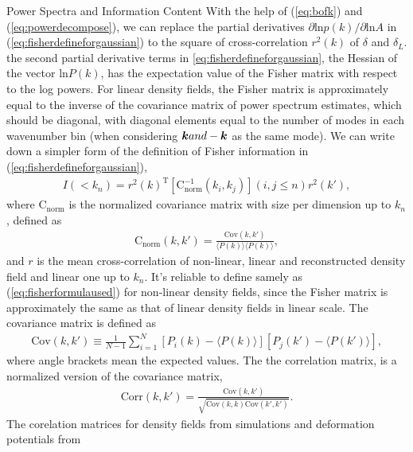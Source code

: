 \begin{section}{Power Spectra and Information Content}
   With the help of (\ref{eq:bofk}) and (\ref{eq:powerdecompose}), we can replace the partial derivatives 
$\partial \mathrm{ln} p(k) / \partial \mathrm{ln} A$ in (\ref{eq:fisherdefineforgaussian}) to the square of 
cross-correlation $r ^2 (k)$ of $\delta$ and $\delta_L$. the second partial derivative terms in 
\ref{eq:fisherdefineforgaussian}, the Hessian of the vector $\mathrm{ln} P(k)$, has the expectation 
value of the Fisher matrix with respect to the log powers. For linear density fields, the Fisher matrix is 
approximately equal to the inverse of the covariance matrix of power spectrum estimates, which should be diagonal, 
with diagonal elements equal to the number of modes in each wavenumber bin (when considering $\boldsymbol{k} and -\boldsymbol{k}$ 
as the same mode). We can write down a simpler form of the definition of Fisher information in (\ref{eq:fisherdefineforgaussian}), 
\begin{align}
    I \left( < k_n\right) = r^2(k)^{\mathrm{T}} \left[ \mathrm{C^{-1}_{norm}} \left( k_i,k_j \right)\right] \left( i,j \leq n \right) r^2(k'),
\label{eq:fisherformulaused}
\end{align}
where $\mathrm{C_{norm}}$ is the normalized covariance matrix with size per dimension up to $k_n$, defined as
\begin{align}
    \mathrm{C_{norm}} \left( k,k' \right)=\frac{\mathrm{Cov}(k,k')}{\langle P(k)\rangle\langle P(k)\rangle},
\end{align}
and $r$ is the mean cross-correlation of non-linear, linear and reconstructed density field and linear one up to $k_n$. 
It's reliable to define samely as (\ref{eq:fisherformulaused}) for non-linear density fields, 
since the Fisher matrix is approximately the same as that of linear density fields in linear scale. 
The covariance matrix is defined as 
\begin{align}
    \mathrm{Cov}\left(k,k'\right)\equiv \frac{1}{N-1}\sum_{i=1}^{N}\left[ P_i \left( k \right) - 
\langle P \left( k \right) \rangle \right]\left[ P_j \left( k' \right) - \langle P \left( k' \right)\rangle \right],
\end{align}
where angle brackets mean the expected values.
    The the correlation matrix, is a                                                    
normalized version of the covariance matrix,
\begin{align}
    \mathrm{Corr}\left(k,k'\right)=\frac{\mathrm{Cov}\left(k,k'\right)}{\sqrt{\mathrm{Cov}\left(k,k\right)\mathrm{Cov}\left(k',k'\right)}}.
\end{align}
The corelation matrices for density fields from simulations and deformation potentials from

\end{section}
